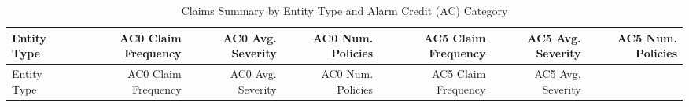 \documentclass[]{book}
\theoremstyle{definition}
\theoremstyle{definition}
\theoremstyle{definition}
\theoremstyle{remark}
\begin{document}
\begin{longtable}[]{@{}lrrrrrr@{}}
\caption{\label{tab:RateAlarmCredit} Claims Summary by Entity Type and Alarm
Credit (AC) Category}\tabularnewline
\toprule
\begin{minipage}[b]{0.10\columnwidth}\raggedright\strut
Entity Type\strut
\end{minipage} & \begin{minipage}[b]{0.12\columnwidth}\raggedleft\strut
AC0 Claim Frequency\strut
\end{minipage} & \begin{minipage}[b]{0.11\columnwidth}\raggedleft\strut
AC0 Avg. Severity\strut
\end{minipage} & \begin{minipage}[b]{0.11\columnwidth}\raggedleft\strut
AC0 Num. Policies\strut
\end{minipage} & \begin{minipage}[b]{0.12\columnwidth}\raggedleft\strut
AC5 Claim Frequency\strut
\end{minipage} & \begin{minipage}[b]{0.11\columnwidth}\raggedleft\strut
AC5 Avg. Severity\strut
\end{minipage} & \begin{minipage}[b]{0.11\columnwidth}\raggedleft\strut
AC5 Num. Policies\strut
\end{minipage}\tabularnewline
\midrule
\endfirsthead
\toprule
\begin{minipage}[b]{0.10\columnwidth}\raggedright\strut
Entity Type\strut
\end{minipage} & \begin{minipage}[b]{0.12\columnwidth}\raggedleft\strut
AC0 Claim Frequency\strut
\end{minipage} & \begin{minipage}[b]{0.11\columnwidth}\raggedleft\strut
AC0 Avg. Severity\strut
\end{minipage} & \begin{minipage}[b]{0.11\columnwidth}\raggedleft\strut
AC0 Num. Policies\strut
\end{minipage} & \begin{minipage}[b]{0.12\columnwidth}\raggedleft\strut
AC5 Claim Frequency\strut
\end{minipage} & \begin{minipage}[b]{0.11\columnwidth}\raggedleft\strut
AC5 Avg. Severity\strut
\end{minipage} & \begin{minipage}[b]{0.11\columnwidth}\raggedleft\strut

\end{minipage}
\end{longtable}
\end{document}
